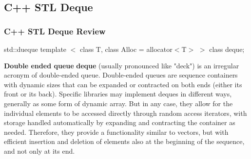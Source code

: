\documentclass{beamer}
\begin{document}
\subsection{C++ STL Deque} 
\begin{frame}
\frametitle{C++ STL Deque Review}
\begin{block}{std::dueque}
template $<$ class T, class Alloc = allocator$<$T$>$ $>$ class deque;
\end{block}
\begin{block}{\textbf{Double ended queue}}
\textbf{deque} (usually pronounced like "deck") is an irregular acronym of double-ended queue. Double-ended queues are sequence containers with dynamic sizes that can be expanded or contracted on both ends (either its front or its back).
Specific libraries may implement deques in different ways, generally as some form of dynamic array. But in any case, they allow for the individual elements to be accessed directly through random access iterators, with storage handled automatically by expanding and contracting the container as needed.
Therefore, they provide a functionality similar to vectors, but with efficient insertion and deletion of elements also at the beginning of the sequence, and not only at its end. 
\end{block}
\end{frame}
\end{document}
